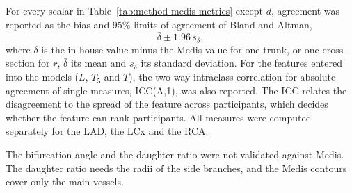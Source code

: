 For every scalar in Table~\ref{tab:method-medis-metrics} except $\bar{d}$, agreement was reported as the bias and 95\% limits of agreement of Bland and Altman,
\begin{equation}
  \bar{\delta} \pm 1.96\, s_\delta ,
  \label{eq:method-medis-ba}
\end{equation}
where $\delta$ is the in-house value minus the Medis value for one trunk, or one cross-section for $r$, $\bar{\delta}$ its mean and $s_\delta$ its standard deviation.
For the features entered into the models ($L$, $T_5$ and $T$), the two-way intraclass correlation for absolute agreement of single measures, ICC(A,1), was also reported.
The ICC relates the disagreement to the spread of the feature across participants, which decides whether the feature can rank participants.
All measures were computed separately for the LAD, the LCx and the RCA.

The bifurcation angle and the daughter ratio were not validated against Medis.
The daughter ratio needs the radii of the side branches, and the Medis contours cover only the main vessels.
